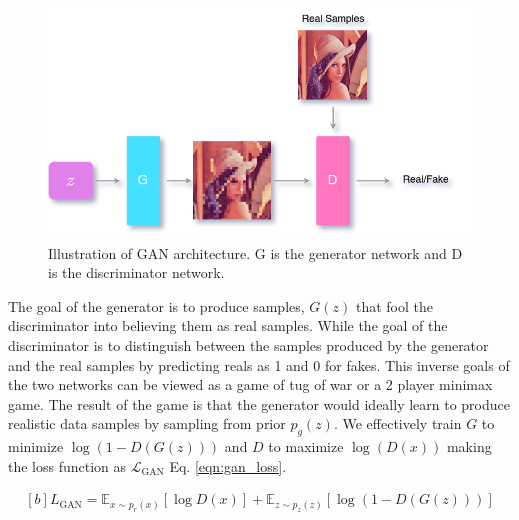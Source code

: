 \begin{figure}[!h]
    \centering
    \includegraphics[scale=0.4]{figures/arch/gan_arch.png}
    \caption{Illustration of GAN architecture. G is the generator network and D is the discriminator network.}
    \label{fig:gan_arch}
\end{figure}

The goal of the generator is to produce samples, $G(z)$ that fool the discriminator into believing them as real samples. While the goal of the discriminator is to distinguish between the samples produced by the generator and the real samples by predicting reals as 1 and 0 for fakes. This inverse goals of the two networks can be viewed as a game of tug of war or a 2 player minimax game. The result of the game is that the generator would ideally learn to produce realistic data samples by sampling from prior $p_{g}(z)$. We effectively train $G$ to minimize $\log(1-D(G({z})))$ and $D$ to maximize $\log(D(x))$ making the loss function as $\mathcal{L}_{\mathrm{GAN}}$ Eq. \ref{eqn:gan_loss}.

\begin{equation} \label{eqn:gan_loss}
    \begin{gathered}[b]
        {L}_{\mathrm{GAN}}=\mathbb{E}_{{x} \sim p_{r}(x)}[\log D({x})]+\mathbb{E}_{{z} \sim p_{z}(z)}[\log (1-D(G({z})))]
    \end{gathered}
\end{equation}

